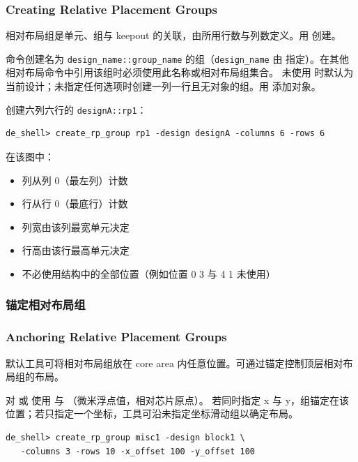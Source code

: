 \subsubsection*{Creating Relative Placement Groups}

相对布局组是单元、组与 keepout 的关联，由所用行数与列数定义。用  创建。

命令创建名为 \texttt{design\_name::group\_name} 的组（\texttt{design\_name} 由  指定）。在其他相对布局命令中引用该组时必须使用此名称或相对布局组集合。
未使用  时默认为当前设计；未指定任何选项时创建一列一行且无对象的组。用  添加对象。

创建六列六行的 \texttt{designA::rp1}：
\begin{lstlisting}
de_shell> create_rp_group rp1 -design designA -columns 6 -rows 6
\end{lstlisting}


在该图中：
\begin{itemize}
  \item 列从列 0（最左列）计数
  \item 行从行 0（最底行）计数
  \item 列宽由该列最宽单元决定
  \item 行高由该行最高单元决定
  \item 不必使用结构中的全部位置（例如位置 0 3 与 4 1 未使用）
\end{itemize}

\subsubsection{锚定相对布局组}
\subsubsection*{Anchoring Relative Placement Groups}

默认工具可将相对布局组放在 core area 内任意位置。可通过锚定控制顶层相对布局组的布局。

对  或  使用  与 （微米浮点值，相对芯片原点）。
若同时指定 x 与 y，组锚定在该位置；若只指定一个坐标，工具可沿未指定坐标滑动组以确定布局。

\begin{lstlisting}
de_shell> create_rp_group misc1 -design block1 \
   -columns 3 -rows 10 -x_offset 100 -y_offset 100
\end{lstlisting}

